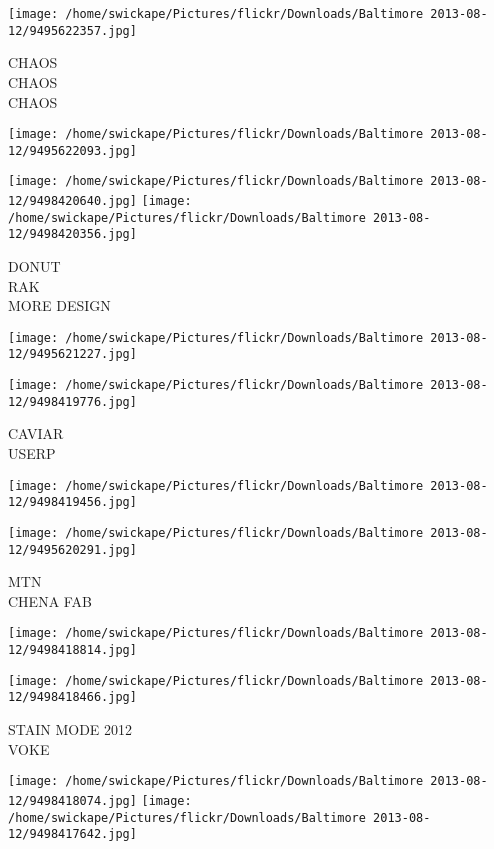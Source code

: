 \documentclass[10pt,letterpaper]{article}
\begin{document}
\texttt{[image: /home/swickape/Pictures/flickr/Downloads/Baltimore 2013-08-12/9495622357.jpg]}

CHAOS\\
CHAOS\\
CHAOS
\pagebreak

\texttt{[image: /home/swickape/Pictures/flickr/Downloads/Baltimore 2013-08-12/9495622093.jpg]}

\vspace{0.25in}
\texttt{[image: /home/swickape/Pictures/flickr/Downloads/Baltimore 2013-08-12/9498420640.jpg]}
\texttt{[image: /home/swickape/Pictures/flickr/Downloads/Baltimore 2013-08-12/9498420356.jpg]}

DONUT\\
RAK\\
MORE DESIGN
\pagebreak

\texttt{[image: /home/swickape/Pictures/flickr/Downloads/Baltimore 2013-08-12/9495621227.jpg]}

\vspace{0.25in}
\texttt{[image: /home/swickape/Pictures/flickr/Downloads/Baltimore 2013-08-12/9498419776.jpg]}

CAVIAR\\
USERP
\pagebreak

\texttt{[image: /home/swickape/Pictures/flickr/Downloads/Baltimore 2013-08-12/9498419456.jpg]}

\vspace{0.25in}
\texttt{[image: /home/swickape/Pictures/flickr/Downloads/Baltimore 2013-08-12/9495620291.jpg]}

MTN\\
CHENA FAB
\pagebreak

\texttt{[image: /home/swickape/Pictures/flickr/Downloads/Baltimore 2013-08-12/9498418814.jpg]}

\vspace{0.25in}
\texttt{[image: /home/swickape/Pictures/flickr/Downloads/Baltimore 2013-08-12/9498418466.jpg]}

STAIN MODE 2012\\
VOKE
\pagebreak

\texttt{[image: /home/swickape/Pictures/flickr/Downloads/Baltimore 2013-08-12/9498418074.jpg]}
\texttt{[image: /home/swickape/Pictures/flickr/Downloads/Baltimore 2013-08-12/9498417642.jpg]}
\end{document}
